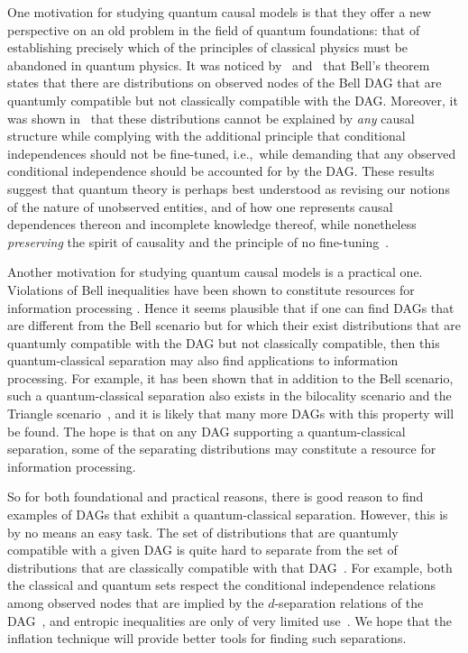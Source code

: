 \documentclass[aps,english,10pt,superscriptaddress,onecolumn,twoside,longbibliography,pra,floatfix,fleqn,nofootinbib]{revtex4-1}%
\theoremstyle{definition}
\newcounter{example}[section]
\begin{document}
One motivation for studying quantum causal models is that they offer a new perspective on an old  problem in the field of quantum foundations: that of establishing precisely which of the principles of classical physics must be abandoned in quantum physics. It was noticed by~\citet{fritz2012bell} and~\citet{WoodSpekkens} that Bell's theorem~\cite{bell1966lhvm} states that there are distributions on observed nodes of the Bell DAG that are quantumly compatible but not classically compatible with the DAG. Moreover, it was shown in~\cite{WoodSpekkens} that these distributions cannot be explained by \emph{any} causal structure while complying with the additional principle that conditional independences should not be fine-tuned, i.e.,~while demanding that any observed conditional independence should be accounted for by the DAG. These results suggest that quantum theory is perhaps best understood as revising our notions of the nature of unobserved entities, and of how one represents causal dependences thereon and incomplete knowledge thereof, while 
nonetheless {\em preserving} the spirit of causality and the principle of no fine-tuning~\cite{leifer2013conditionalstates,Spekkens2015paradigm,henson2011ontic}.

Another motivation for studying quantum causal models is a practical one.  Violations of Bell inequalities have  been shown to constitute resources for information processing \cite{NoSigPolytope,scarani2012device,BancalDIApproach}. Hence it seems plausible that if one can find DAGs that are different from the Bell scenario but for which their exist distributions that are quantumly compatible with the DAG but not classically compatible, then this quantum-classical separation may also find applications to information processing. 
For example, it has been shown that in addition to the Bell scenario, such a quantum-classical separation also exists 
in the bilocality scenario \cite{BilocalCorrelations} and the Triangle scenario~\cite{fritz2012bell}, and it is likely that many more DAGs with this property will be found.  The hope is that on any DAG supporting a quantum-classical separation, some of the separating distributions may constitute a resource for information processing. 

So for both foundational and practical reasons, there is good reason to find examples of DAGs that exhibit a quantum-classical separation.
However, this is by no means an easy task.
The set of distributions that are quantumly compatible with a given DAG is quite hard to separate from the set of distributions that are classically compatible with that DAG~\cite{pusey2014gdag,fritz2012bell}. For example, both the classical and quantum sets respect the conditional independence relations among observed nodes that are implied by the $d$-separation relations of the DAG~\cite{pusey2014gdag}, and entropic inequalities are only of very limited use~\cite{chaves2012entropic,fritz2012bell}. We hope that the inflation technique will provide better tools for finding such separations.
\end{document}
